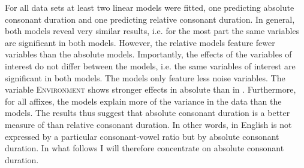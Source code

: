For all data sets at least two linear models were fitted, one predicting absolute consonant duration and one predicting relative consonant duration. 
In general, both models reveal very similar results, i.e. for the most part the same variables are significant in both models. However, the relative models feature fewer variables than the absolute models.  Importantly, the effects of the variables of interest do not differ between the models, i.e. the same variables of interest are significant in both models. The  models only feature less noise variables. 
The variable \textsc{Environment} shows stronger effects in absolute than in . 
Furthermore, for all affixes, the  models explain more of the variance in the data than the  models. 
The results thus suggest that absolute consonant duration is a better measure of  than relative consonant duration. In other words,  in English is not expressed by a particular consonant-vowel ratio but by absolute consonant duration. 
In what follows I will therefore concentrate on absolute consonant duration.

